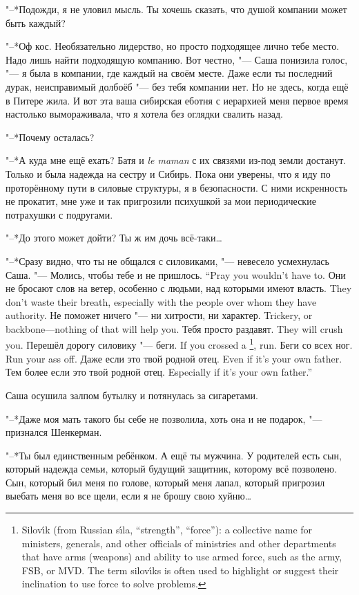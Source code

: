 "--*Подожди, я не уловил мысль.
Ты хочешь сказать, что душой компании может быть каждый?

"--*Оф кос.
Необязательно лидерство, но просто подходящее лично тебе место.
Надо лишь найти подходящую компанию.
Вот честно, "--- Саша понизила голос, "--- я была в компании, где каждый на своём месте.
Даже если ты последний дурак, неисправимый долбоёб "--- без тебя компании нет.
Но не здесь, когда ещё в Питере жила.
И вот эта ваша сибирская еботня с иерархией меня первое время настолько вымораживала, что я хотела без оглядки свалить назад.

"--*Почему осталась?

"--*А куда мне ещё ехать?
Батя и \textit{le maman} с их связями из-под земли достанут.
Только и была надежда на сестру и Сибирь.
Пока они уверены, что я иду по проторённому пути в силовые структуры, я в безопасности.
С ними искренность не прокатит, мне уже и так пригрозили психушкой за мои периодические потрахушки с подругами.

"--*До этого может дойти?
Ты ж им дочь всё-таки\ldots{}

"--*Сразу видно, что ты не общался с силовиками, "--- невесело усмехнулась Саша.
{"--- Молись, чтобы тебе и не пришлось.}
{``Pray you wouldn't have to.}
{Они не бросают слов на ветер, особенно с людьми, над которыми имеют власть.}
{They don't waste their breath, especially with the people over whom they have authority.}
{Не поможет ничего "--- ни хитрости, ни характер.}
{Trickery, or backbone---nothing of that will help you.}
{Тебя просто раздавят.}
{They will crush you.}
{Перешёл дорогу силовику "--- беги.}
{If you crossed a \silovik\footnote{Silov\'{\i}k (from Russian s\'{\i}la, ``strength'', ``force''): a collective name for ministers, generals, and other officials of ministries and other departments that have arms (weapons) and ability to use armed force, such as the army, FSB, or MVD. The term silov\'{\i}ks is often used to highlight or suggest their inclination to use force to solve problems.}, run.}
{Беги со всех ног.}
{Run your ass off.}
{Даже если это твой родной отец.}
{Even if it's your own father.}
{Тем более если это твой родной отец.}
{Especially if it's your own father.''}

Саша осушила залпом бутылку и потянулась за сигаретами.

"--*Даже моя мать такого бы себе не позволила, хоть она и не подарок, "--- признался Шенкерман.

"--*Ты был единственным ребёнком.
А ещё ты мужчина.
У родителей есть сын, который надежда семьи, который будущий защитник, которому всё позволено.
Сын, который бил меня по голове, который меня лапал, который пригрозил выебать меня во все щели, если я не брошу свою хуйню\ldots{}

